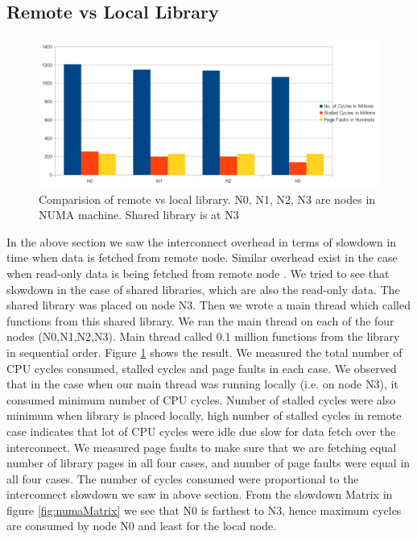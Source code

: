 \subsection{Remote vs Local Library} \label{sec:remoteVsLocal}

\begin{figure}
    \centering
    \includegraphics[scale=0.35]{remoteVsLocal.png}
    \caption{Comparision of remote vs local library. N0, N1, N2, N3 are nodes in NUMA machine. Shared library is at N3 }
    \label{fig:remoteVsLocal}
\end{figure}


In the above section we saw the interconnect overhead in terms of slowdown in time when data is fetched from remote node.
Similar overhead exist in the case when read-only data is being fetched from remote node \cite{Drepper07whatevery}.
We tried to see that slowdown in the case of shared libraries, which are also the read-only data.
The shared library was placed on node N3.
Then we wrote a main thread which called functions from this shared library.
We ran the main thread on each of the four nodes (N0,N1,N2,N3).
Main thread called 0.1 million functions from the library in sequential order.
Figure \ref{fig:remoteVsLocal} shows the result.
We measured the total number of CPU cycles consumed, stalled cycles and page faults in each case.
We observed that in the case when our main thread was running locally (i.e. on node N3), it consumed minimum number of CPU cycles.
Number of stalled cycles were also minimum when library is placed locally, high number of stalled cycles in remote case indicates that lot of CPU cycles were idle due slow for data fetch over the interconnect.
We measured page faults to make sure that we are fetching equal number of library pages in all four cases, and number of page faults were equal in all four cases.
The number of cycles consumed were proportional to the interconnect slowdown we saw in above section.
From the slowdown Matrix in figure \ref{fig:numaMatrix} we see that N0 is farthest to N3, hence maximum cycles are consumed by node N0 and least for the local node.



